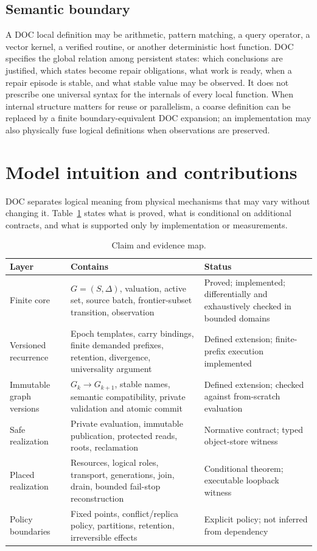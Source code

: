 \subsection{Semantic boundary}
A DOC local definition may be arithmetic, pattern matching, a query operator, a vector kernel, a verified routine, or another deterministic host function. DOC specifies the global relation among persistent states: which conclusions are justified, which states become repair obligations, what work is ready, when a repair episode is stable, and what stable value may be observed. It does not prescribe one universal syntax for the internals of every local function. When internal structure matters for reuse or parallelism, a coarse definition can be replaced by a finite boundary-equivalent DOC expansion; an implementation may also physically fuse logical definitions when observations are preserved.

\section{Model intuition and contributions}
DOC separates logical meaning from physical mechanisms that may vary without changing it. Table~\ref{tab:claimmap} states what is proved, what is conditional on additional contracts, and what is supported only by implementation or measurements.

\begin{table}[t]
\centering\footnotesize
\caption{Claim and evidence map.}\label{tab:claimmap}
\begin{tabularx}{\textwidth}{@{}p{}X p{}@{}}
\toprule Layer & Contains & Status\\ \midrule
Finite core & $G=(S,\Delta)$, valuation, active set, source batch, frontier-subset transition, observation & Proved; implemented; differentially and exhaustively checked in bounded domains\\
Versioned recurrence & Epoch templates, carry bindings, finite demanded prefixes, retention, divergence, universality argument & Defined extension; finite-prefix execution implemented\\
Immutable graph versions & $G_k\to G_{k+1}$, stable names, semantic compatibility, private validation and atomic commit & Defined extension; checked against from-scratch evaluation\\
Safe realization & Private evaluation, immutable publication, protected reads, roots, reclamation & Normative contract; typed object-store witness\\
Placed realization & Resources, logical roles, transport, generations, join, drain, bounded fail-stop reconstruction & Conditional theorem; executable loopback witness\\
Policy boundaries & Fixed points, conflict/replica policy, partitions, retention, irreversible effects & Explicit policy; not inferred from dependency\\ \bottomrule
\end{tabularx}
\end{table}

